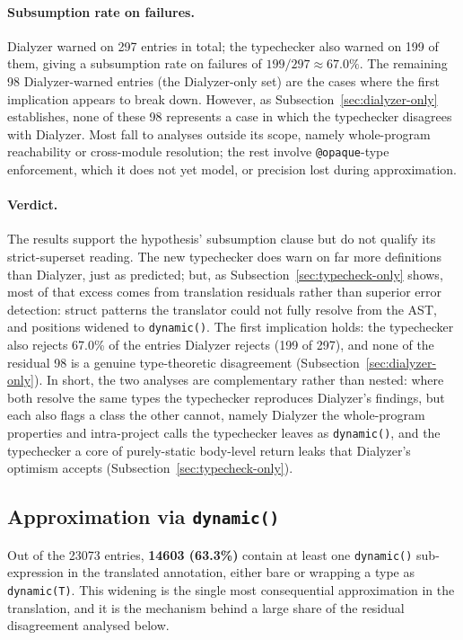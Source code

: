 \paragraph{Subsumption rate on failures.}
Dialyzer warned on 297 entries in total; the typechecker also warned on 199 of them, giving a subsumption rate on failures of $199/297 \approx 67.0\%$.
The remaining 98 Dialyzer-warned entries (the Dialyzer-only set) are the cases where the first implication appears to break down.
However, as Subsection~\ref{sec:dialyzer-only} establishes, none of these 98 represents a case in which the typechecker disagrees with Dialyzer. Most fall to analyses outside its scope, namely whole-program reachability or cross-module resolution; the rest involve \texttt{@opaque}-type enforcement, which it does not yet model, or precision lost during approximation.

\paragraph{Verdict.}
The results support the hypothesis' subsumption clause but do not qualify its strict-superset reading.
The new typechecker does warn on far more definitions than Dialyzer, just as predicted; but, as Subsection~\ref{sec:typecheck-only} shows, most of that excess comes from translation residuals rather than superior error detection: struct patterns the translator could not fully resolve from the AST, and positions widened to \texttt{dynamic()}.
The first implication holds: the typechecker also rejects 67.0\% of the entries Dialyzer rejects (199 of 297), and none of the residual 98 is a genuine type-theoretic disagreement (Subsection~\ref{sec:dialyzer-only}).
In short, the two analyses are complementary rather than nested: where both resolve the same types the typechecker reproduces Dialyzer's findings, but each also flags a class the other cannot, namely Dialyzer the whole-program properties and intra-project calls the typechecker leaves as \texttt{dynamic()}, and the typechecker a core of purely-static body-level return leaks that Dialyzer's optimism accepts (Subsection~\ref{sec:typecheck-only}).

\subsection{Approximation via \texttt{dynamic()}}
\label{sec:approximation-via-dynamic}

Out of the \num{23073} entries, \textbf{\num{14603} (63.3\%)} contain at least one \texttt{dynamic()} sub-expression in the translated annotation, either bare or wrapping a type as \texttt{dynamic(T)}.
This widening is the single most consequential approximation in the translation, and it is the mechanism behind a large share of the residual disagreement analysed below.

